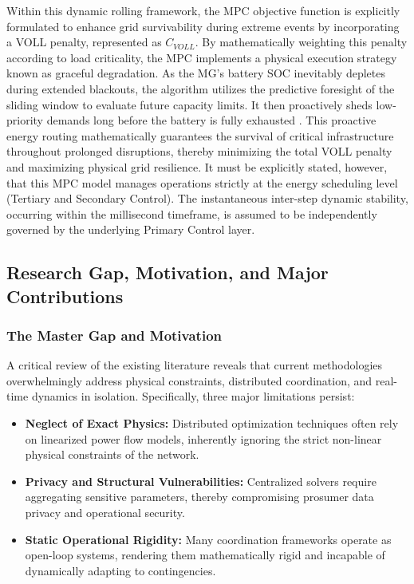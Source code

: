 Within this dynamic rolling framework, the MPC objective function is explicitly formulated to enhance grid survivability during extreme events by incorporating a VOLL penalty, represented as $C_{VOLL}$. By mathematically weighting this penalty according to load criticality, the MPC implements a physical execution strategy known as graceful degradation. As the MG's battery SOC inevitably depletes during extended blackouts, the algorithm utilizes the predictive foresight of the sliding window to evaluate future capacity limits. It then proactively sheds low-priority demands long before the battery is fully exhausted \cite{zhou2025networked}. This proactive energy routing mathematically guarantees the survival of critical infrastructure throughout prolonged disruptions, thereby minimizing the total VOLL penalty and maximizing physical grid resilience. It must be explicitly stated, however, that this MPC model manages operations strictly at the energy scheduling level (Tertiary and Secondary Control). The instantaneous inter-step dynamic stability, occurring within the millisecond timeframe, is assumed to be independently governed by the underlying Primary Control layer.

\subsection{Research Gap, Motivation, and Major Contributions}

\subsubsection{The Master Gap and Motivation}
A critical review of the existing literature reveals that current methodologies overwhelmingly address physical constraints, distributed coordination, and real-time dynamics in isolation. Specifically, three major limitations persist:

\begin{itemize}
    \item \textbf{Neglect of Exact Physics:} Distributed optimization techniques often rely on linearized power flow models, inherently ignoring the strict non-linear physical constraints of the network.
    \item \textbf{Privacy and Structural Vulnerabilities:} Centralized solvers require aggregating sensitive parameters, thereby compromising prosumer data privacy and operational security.
    \item \textbf{Static Operational Rigidity:} Many coordination frameworks operate as open-loop systems, rendering them mathematically rigid and incapable of dynamically adapting to contingencies.
\end{itemize}

